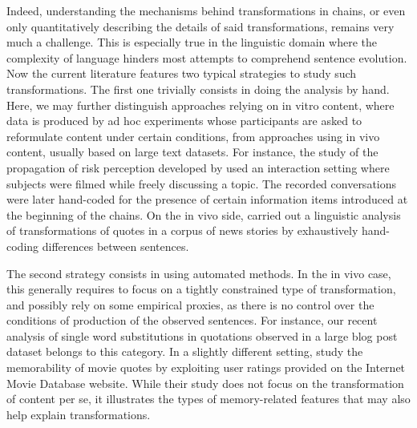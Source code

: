 Indeed, understanding the mechanisms behind transformations in chains, or even only quantitatively describing the details of said transformations, remains very much a challenge.  This is especially true in the linguistic domain where the complexity of language hinders most attempts to comprehend sentence evolution. Now the current literature features two typical strategies to study such transformations. The first one trivially consists in doing the analysis by hand.  Here, we may further distinguish approaches relying on in vitro content, where data is produced by ad hoc experiments whose participants are asked to reformulate content under certain conditions, from approaches using in vivo content, usually based on large text datasets.
For instance, the study of the propagation of risk perception developed by \textcite{moussaid_amplification_2015} used an interaction setting where subjects were filmed while freely discussing a topic. The recorded conversations were later hand-coded for the presence of certain information items introduced at the beginning of the chains. On the in vivo side, \textcite{lauf_analyzing_2013} carried out a linguistic analysis of transformations of quotes in a corpus of news stories by exhaustively hand-coding differences between sentences.

The second strategy consists in using automated methods.  In the in vivo case, this generally requires to focus on a tightly constrained type of transformation, and possibly rely on some empirical proxies, as there is no control over the conditions of production of the observed sentences. %
For instance, our recent analysis of single word substitutions in quotations observed in a large blog post dataset \autocite{lerique-2018-semantic-drift} belongs to this category.
In a slightly different setting, \textcite{danescu-niculescu-mizil_you_2012} study the memorability of movie quotes by exploiting user ratings provided on the Internet Movie Database website. While their study does not focus on the transformation of content per se, it illustrates the types of memory-related features that may also help explain transformations. 

